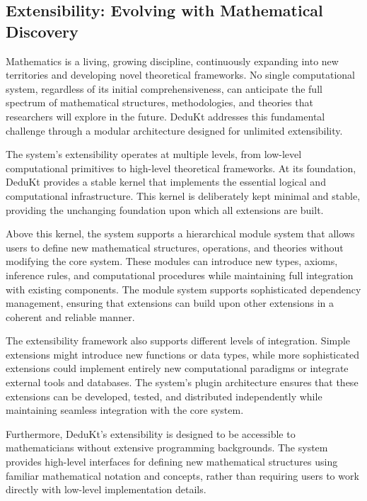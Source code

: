 \subsection{Extensibility: Evolving with Mathematical Discovery}\label{subsec:extensibility:-evolving-with-mathematical-discovery}

Mathematics is a living, growing discipline, continuously expanding into new territories and developing novel theoretical frameworks.
No single computational system, regardless of its initial comprehensiveness, can anticipate the full spectrum of mathematical structures, methodologies, and theories that researchers will explore in the future.
DeduKt addresses this fundamental challenge through a modular architecture designed for unlimited extensibility.

The system's extensibility operates at multiple levels, from low-level computational primitives to high-level theoretical frameworks.
At its foundation, DeduKt provides a stable kernel that implements the essential logical and computational infrastructure.
This kernel is deliberately kept minimal and stable, providing the unchanging foundation upon which all extensions are built.

Above this kernel, the system supports a hierarchical module system that allows users to define new mathematical structures, operations, and theories without modifying the core system.
These modules can introduce new types, axioms, inference rules, and computational procedures while maintaining full integration with existing components.
The module system supports sophisticated dependency management, ensuring that extensions can build upon other extensions in a coherent and reliable manner.

The extensibility framework also supports different levels of integration.
Simple extensions might introduce new functions or data types, while more sophisticated extensions could implement entirely new computational paradigms or integrate external tools and databases.
The system's plugin architecture ensures that these extensions can be developed, tested, and distributed independently while maintaining seamless integration with the core system.

Furthermore, DeduKt's extensibility is designed to be accessible to mathematicians without extensive programming backgrounds.
The system provides high-level interfaces for defining new mathematical structures using familiar mathematical notation and concepts, rather than requiring users to work directly with low-level implementation details.

